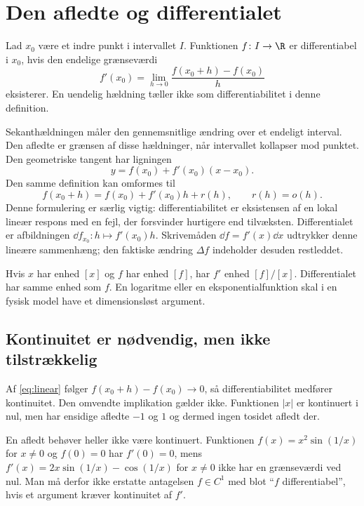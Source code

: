 \section{Den afledte og differentialet}
\label{sec:def}
\begin{definition}
Lad $x_0$ være et indre punkt i intervallet $I$. Funktionen $f\colon I\to\R$ er differentiabel i $x_0$, hvis den endelige grænseværdi
\[
 f'(x_0)=\lim_{h\to0}\frac{f(x_0+h)-f(x_0)}{h}
\]
eksisterer. En uendelig hældning tæller ikke som differentiabilitet i denne definition.
\end{definition}
Sekanthældningen måler den gennemsnitlige ændring over et endeligt interval. Den afledte er grænsen af disse hældninger, når intervallet kollapser mod punktet. Den geometriske tangent har ligningen
\[
 y=f(x_0)+f'(x_0)(x-x_0).
\]
Den samme definition kan omformes til
\begin{equation}
 f(x_0+h)=f(x_0)+f'(x_0)h+r(h),\qquad r(h)=o(h).
 \label{eq:linear}
\end{equation}
Denne formulering er særlig vigtig: differentiabilitet er eksistensen af en lokal lineær respons med en fejl, der forsvinder hurtigere end tilvæksten. Differentialet er afbildningen $\dd f_{x_0}\colon h\mapsto f'(x_0)h$. Skrivemåden $\dd f=f'(x)\dd x$ udtrykker denne lineære sammenhæng; den faktiske ændring $\Delta f$ indeholder desuden restleddet.

Hvis $x$ har enhed $[x]$ og $f$ har enhed $[f]$, har $f'$ enhed $[f]/[x]$. Differentialet har samme enhed som $f$. En logaritme eller en eksponentialfunktion skal i en fysisk model have et dimensionsløst argument.



\subsection{Kontinuitet er nødvendig, men ikke tilstrækkelig}
Af \eqref{eq:linear} følger $f(x_0+h)-f(x_0)\to0$, så differentiabilitet medfører kontinuitet. Den omvendte implikation gælder ikke. Funktionen $|x|$ er kontinuert i nul, men har ensidige afledte $-1$ og $1$ og dermed ingen tosidet afledt der.

En afledt behøver heller ikke være kontinuert. Funktionen $f(x)=x^2\sin(1/x)$ for $x\ne0$ og $f(0)=0$ har $f'(0)=0$, mens $f'(x)=2x\sin(1/x)-\cos(1/x)$ for $x\ne0$ ikke har en grænseværdi ved nul. Man må derfor ikke erstatte antagelsen $f\in C^1$ med blot ``$f$ differentiabel'', hvis et argument kræver kontinuitet af $f'$.

